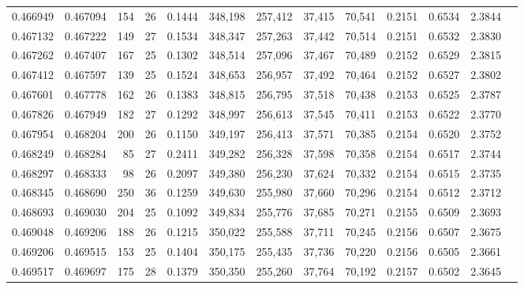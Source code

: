 \begin{tabular}{rrrrrrrrrrrrr}
0.466949 & 0.467094 &    154 &    26 &                                     0.1444 & 348,198 & 257,412 &  37,415 &  70,541 & 0.2151 & 0.6534 & 2.3844 \\
0.467132 & 0.467222 &    149 &    27 &                                     0.1534 & 348,347 & 257,263 &  37,442 &  70,514 & 0.2151 & 0.6532 & 2.3830 \\
0.467262 & 0.467407 &    167 &    25 &                                     0.1302 & 348,514 & 257,096 &  37,467 &  70,489 & 0.2152 & 0.6529 & 2.3815 \\
0.467412 & 0.467597 &    139 &    25 &                                     0.1524 & 348,653 & 256,957 &  37,492 &  70,464 & 0.2152 & 0.6527 & 2.3802 \\
0.467601 & 0.467778 &    162 &    26 &                                     0.1383 & 348,815 & 256,795 &  37,518 &  70,438 & 0.2153 & 0.6525 & 2.3787 \\
0.467826 & 0.467949 &    182 &    27 &                                     0.1292 & 348,997 & 256,613 &  37,545 &  70,411 & 0.2153 & 0.6522 & 2.3770 \\
0.467954 & 0.468204 &    200 &    26 &                                     0.1150 & 349,197 & 256,413 &  37,571 &  70,385 & 0.2154 & 0.6520 & 2.3752 \\
0.468249 & 0.468284 &     85 &    27 &                                     0.2411 & 349,282 & 256,328 &  37,598 &  70,358 & 0.2154 & 0.6517 & 2.3744 \\
0.468297 & 0.468333 &     98 &    26 &                                     0.2097 & 349,380 & 256,230 &  37,624 &  70,332 & 0.2154 & 0.6515 & 2.3735 \\
0.468345 & 0.468690 &    250 &    36 &                                     0.1259 & 349,630 & 255,980 &  37,660 &  70,296 & 0.2154 & 0.6512 & 2.3712 \\
0.468693 & 0.469030 &    204 &    25 &                                     0.1092 & 349,834 & 255,776 &  37,685 &  70,271 & 0.2155 & 0.6509 & 2.3693 \\
0.469048 & 0.469206 &    188 &    26 &                                     0.1215 & 350,022 & 255,588 &  37,711 &  70,245 & 0.2156 & 0.6507 & 2.3675 \\
0.469206 & 0.469515 &    153 &    25 &                                     0.1404 & 350,175 & 255,435 &  37,736 &  70,220 & 0.2156 & 0.6505 & 2.3661 \\
0.469517 & 0.469697 &    175 &    28 &                                     0.1379 & 350,350 & 255,260 &  37,764 &  70,192 & 0.2157 & 0.6502 & 2.3645 \\

\end{tabular}
